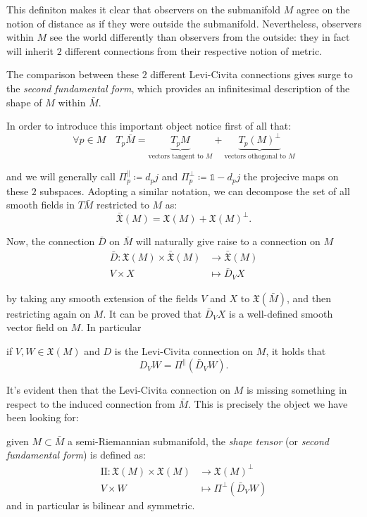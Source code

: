 This definiton makes it clear that observers on the submanifold \(M\) agree on the notion of distance as if they were outside the submanifold. Nevertheless, observers within \(M\) see the world differently than observers from the outside: they in fact will inherit \(2\) different connections from their respective notion of metric. 

The comparison between these \(2\) different Levi-Civita connections gives surge to the \emph{second fundamental form}, which provides an infinitesimal description of the shape of \(M\) within \(\bar{M}\).

In order to introduce this important object notice first of all that:
\[
\forall p \in M \quad T_p\bar{M} = \underbrace{T_pM}_{\text{vectors tangent to }M}+ \underbrace{T_p(M)^{\perp}}_{\text{vectors othogonal to } M}
\]

\noindent and we will generally call \(\Pi_p^{\parallel}\coloneqq d_pj\) and \(\Pi_p^{\perp}\coloneqq \mathbb{1} - d_pj\) the projecive maps on these \(2\) subspaces.
Adopting a similar notation, we can decompose the set of all smooth fields in \(T\bar{M}\) restricted to \(M\) as:
\[
\bar{\mathfrak{X}}(M) = \mathfrak{X}(M) + \mathfrak{X}(M)^{\perp}.
\]

Now, the connection \(\bar{D}\) on \(\bar{M}\) will naturally give raise to a connection on \(M\)
\begin{align*}
\bar{D} : \mathfrak{X}(M) \times \bar{\mathfrak{X}}(M) & \rightarrow \bar{\mathfrak{X}}(M) \\
	 V \times X &\mapsto \bar{D}_V X
\end{align*}

by taking any smooth extension of the fields \(V\) and \(X\) to \(\mathfrak{X}(\bar{M})\), and then restricting again on \(M\). It can be proved that \(\bar{D}_V X\) is a well-defined smooth vector field on \(M\). In particular
\begin{lemma} 
	if \(V, W \in \mathfrak{X}(M)\) and \(D\) is the Levi-Civita connection on \(M\), it holds that
	\[
	D_V W = \Pi^{\parallel}\left(\bar{D}_V W\right).
	\]
\end{lemma}

It's evident then that the Levi-Civita connection on \(M\) is missing something in respect to the induced connection from \(\bar{M}\). This is precisely the object we have been looking for:

\begin{definition}
	given \(M \subset \bar{M}\) a semi-Riemannian submanifold, the \emph{shape tensor} (or \emph{second fundamental form}) is defined as:
	\begin{align*}
		\mathrm{I\!I} : \mathfrak{X}(M) \times \mathfrak{X}(M) &\longrightarrow \mathfrak{X}(M)^{\perp}\\
							V \times W &\mapsto \Pi^{\perp}\left(\bar{D}_V W\right)
	\end{align*}
	\noindent and in particular is bilinear and symmetric.
\end{definition}

